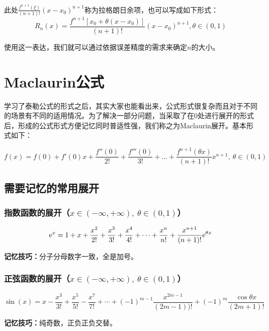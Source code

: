 此处$\frac{f^{n+1}(\xi)}{(n+1)!}(x-x_0)^{n+1}$称为拉格朗日余项，也可以写成如下形式：
$$
R_n(x)=\frac{f^{n+1}[x_0+\theta(x-x_0)]}{(n+1)!}(x-x_0)^{n+1},\theta\in(0,1)
$$

使用这一表达，我们就可以通过依据误差精度的需求来确定$n$的大小。

\section{Maclaurin公式}\label{sec:5.3}
学习了泰勒公式的形式之后，其实大家也能看出来，公式形式很复杂而且对于不同的场景有不同的适用情况。为了解决一部分问题，当采取了在0处进行展开的形式后，形成的公式形式方便记忆同时普适性强，我们称之为Maclaurin展开。基本形式如下：

\begin{equation}
    f(x)=f(0)+f'(0)x+\frac{f''(0)}{2!}+\frac{f'''(0)}{3!}+...+\frac{f^{n+1}(\theta x)}{(n+1)!}x^{n+1},~\theta\in(0,1)
    \label{eq:5.5}
\end{equation}

\subsection{需要记忆的常用展开}\label{sec:5.3.1}

\subsubsection{指数函数的展开（$x\in(-\infty,+\infty),~\theta\in(0,1)$）}

\begin{equation}
	{\rm e}^x=1+x+\frac{x^2}{2!}+\frac{x^3}{3!}+\frac{x^4}{4!}+\cdots+\frac{x^n}{n!}+\frac{x^{n+1}}{(n+1)!}{\rm e}^{\theta x}\label{eq:5.6}
\end{equation}

\noindent\textbf{记忆技巧：}分子分母数字一致，全是加号。

\subsubsection{正弦函数的展开（$x\in(-\infty,+\infty),~\theta\in(0,1)$）}
\begin{equation}
	\sin(x)=x-\frac{x^3}{3!}+\frac{x^5}{5!}-\frac{x^7}{7!}+\cdots+(-1)^{m-1}\frac{x^{2m-1}}{(2m-1))!}+(-1)^m\frac{\cos\theta x}{(2m+1)!}
	\label{eq:5.7}
\end{equation}

\noindent\textbf{记忆技巧：}纯奇数，正负正负交替。

